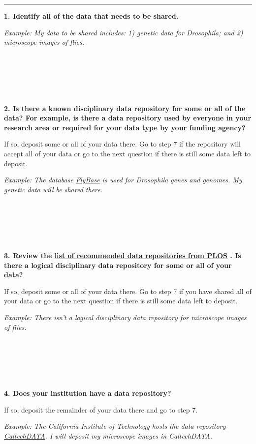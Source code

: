 \documentclass[
]{book}
\begin{document}
\begin{center}\rule{0.5\linewidth}{0.5pt}\end{center}

\textbf{1. Identify all of the data that needs to be shared.}

\emph{Example: My data to be shared includes: 1) genetic data for Drosophila; and 2) microscope images of flies.}

~

~

~

\textbf{2. Is there a known disciplinary data repository for some or all of the data? For example, is there a data repository used by everyone in your research area or required for your data type by your funding agency?}

If so, deposit some or all of your data there. Go to step 7 if the repository will accept all of your data or go to the next question if there is still some data left to deposit.

\emph{Example: The database \href{http://flybase.org/}{FlyBase} is used for Drosophila genes and genomes. My genetic data will be shared there.}

~

~

~

\textbf{3. Review the \href{https://journals.plos.org/plosone/s/recommended-repositories}{list of recommended data repositories from PLOS} \citep{plos_one_recommended_2023}. Is there a logical disciplinary data repository for some or all of your data?}

If so, deposit some or all of your data there. Go to step 7 if you have shared all of your data or go to the next question if there is still some data left to deposit.

\emph{Example: There isn't a logical disciplinary data repository for microscope images of flies.}

~

~

~

\textbf{4. Does your institution have a data repository?}

If so, deposit the remainder of your data there and go to step 7.

\emph{Example: The California Institute of Technology hosts the data repository \href{https://data.caltech.edu/}{CaltechDATA}. I will deposit my microscope images in CaltechDATA.}

~
\end{document}

